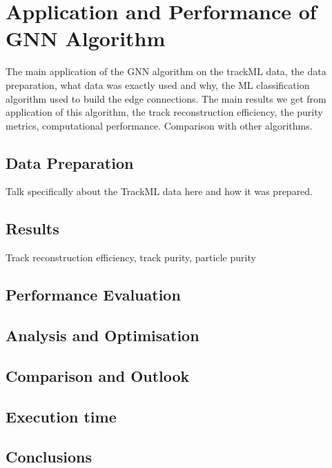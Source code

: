 
\chapter{Application and Performance of GNN Algorithm}
\label{chapter-gnn-results}

The main application of the GNN algorithm on the trackML data, the data preparation, what data was exactly used and why, the ML classification algorithm used to build the edge connections. The main results we get from application of this algorithm, the track reconstruction efficiency, the purity metrics, computational performance. Comparison with other algorithms.

\section{Data Preparation}

Talk specifically about the TrackML data here and how it was prepared.


\section{Results}
Track reconstruction efficiency, track purity, particle purity
\section{Performance Evaluation}
\section{Analysis and Optimisation}
\section{Comparison and Outlook}
\section{Execution time}
\section{Conclusions}